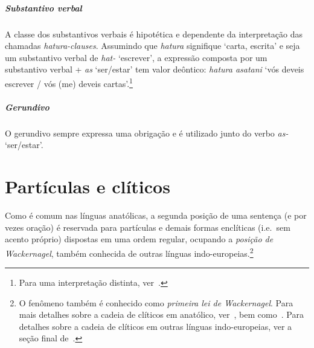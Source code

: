 \paragraph{Substantivo verbal}
A classe dos substantivos verbais é hipotética e dependente da interpretação das
chamadas \emph{\emph{hatura}-clauses}.
Assumindo que \emph{hatura} signifique `carta, escrita' e seja um substantivo
verbal de \emph{hat-} `escrever', a expressão composta por um substantivo
verbal + \emph{as} `ser\slash{}estar' tem valor
deôntico: \emph{hatura asatani} `vós deveis escrever \slash{} vós (me) deveis
cartas'.\footnote{
	Para uma interpretação distinta, ver~\citet{Waal2021}.
}

\paragraph{Gerundivo}
O gerundivo sempre expressa uma obrigação e é utilizado junto do verbo \emph{as-} `ser\slash{}estar'.


\chapter{Partículas e clíticos}

Como é comum nas línguas anatólicas, a segunda posição de uma sentença (e por
vezes oração) é reservada para partículas e demais formas enclíticas  (i.e.\ sem
acento próprio) dispostas em uma ordem regular, ocupando a \emph{posição de Wackernagel}, também conhecida de
outras línguas indo-europeias.\footnote{O fenômeno também é conhecido como
	\emph{primeira lei de Wackernagel}. Para mais detalhes sobre a cadeia de
	clíticos em anatólico, ver~, bem
	como~\citet{Garret1989,Garret1990,AgbayaniGolston2012}.
	Para detalhes sobre a cadeia de clíticos em outras línguas indo-europeias,
	ver a seção final de~\citet{WackernagelsLawI}.
}

